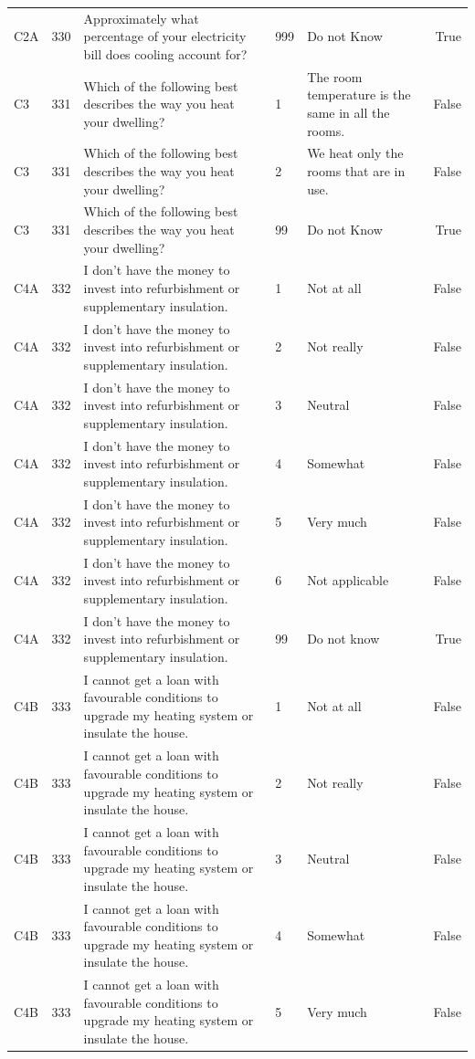 \begin{tabular}{lrlllr}
C2A & 330 & Approximately what percentage of your electricity bill does cooling account for? & 999 & Do not Know & True \\
C3 & 331 & Which of the following best describes the way you heat your dwelling? & 1 & The room temperature is the same in all the rooms. & False \\
C3 & 331 & Which of the following best describes the way you heat your dwelling? & 2 & We heat only the rooms that are in use. & False \\
C3 & 331 & Which of the following best describes the way you heat your dwelling? & 99 & Do not Know & True \\
C4A & 332 &  I don’t have the money to invest into refurbishment or supplementary insulation. & 1 & Not at all & False \\
C4A & 332 &  I don’t have the money to invest into refurbishment or supplementary insulation. & 2 & Not really & False \\
C4A & 332 &  I don’t have the money to invest into refurbishment or supplementary insulation. & 3 & Neutral & False \\
C4A & 332 &  I don’t have the money to invest into refurbishment or supplementary insulation. & 4 & Somewhat & False \\
C4A & 332 &  I don’t have the money to invest into refurbishment or supplementary insulation. & 5 & Very much & False \\
C4A & 332 &  I don’t have the money to invest into refurbishment or supplementary insulation. & 6 & Not applicable & False \\
C4A & 332 &  I don’t have the money to invest into refurbishment or supplementary insulation. & 99 & Do not know & True \\
C4B & 333 &  I cannot get a loan with favourable conditions to upgrade my heating system or insulate the house. & 1 & Not at all & False \\
C4B & 333 &  I cannot get a loan with favourable conditions to upgrade my heating system or insulate the house. & 2 & Not really & False \\
C4B & 333 &  I cannot get a loan with favourable conditions to upgrade my heating system or insulate the house. & 3 & Neutral & False \\
C4B & 333 &  I cannot get a loan with favourable conditions to upgrade my heating system or insulate the house. & 4 & Somewhat & False \\
C4B & 333 &  I cannot get a loan with favourable conditions to upgrade my heating system or insulate the house. & 5 & Very much & False \\

\end{tabular}
